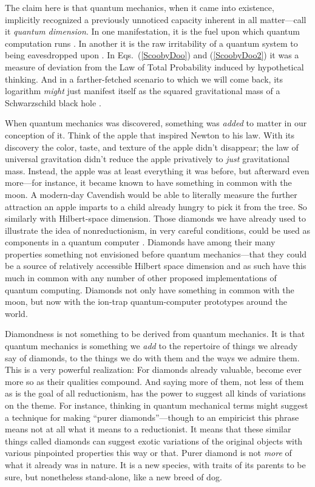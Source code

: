 \documentclass[aps,pra,superscriptaddress,10pt,tightenlines,twocolumn,nofootinbib]{revtex4}
\begin{document}
The claim here is that quantum mechanics, when it came into existence, implicitly recognized a previously unnoticed capacity inherent in all matter---call it {\it quantum dimension}.  In one manifestation, it is the fuel upon which quantum computation runs \cite{Fuchs04b,BlumeKohout02}.  In another it is the raw irritability of a quantum system to being eavesdropped upon \cite{Fuchs03,Cerf02}.  In Eqs.~(\ref{ScoobyDoo}) and (\ref{ScoobyDoo2}) it was a measure of deviation from the Law of Total Probability induced by hypothetical thinking.  And in a farther-fetched scenario to which we will come back, its logarithm {\it might\/} just manifest itself as the squared gravitational mass of a Schwarzschild black hole \cite{Horowitz04,Gottesman04}.

When quantum mechanics was discovered, something was {\it added\/} to matter in our conception of it.  Think of the apple that inspired Newton to his law.  With its discovery the color, taste, and texture of the apple didn't disappear; the law of universal gravitation didn't reduce the apple privatively to {\it just\/} gravitational mass. Instead, the apple was at least everything it was before, but afterward even more---for instance, it became known to have something in common with the moon.  A modern-day Cavendish would be able to literally measure the fur\-ther attraction an apple imparts to a child already hungry to pick it from the tree.  So similarly with Hil\-bert-space dimension.  Those diamonds we have already used to illustrate the idea of nonreductionism, in very careful conditions, could be used as components in a quantum computer \cite{Prawer08}.  Diamonds have among their many properties something not envisioned before quantum mechanics---that they could be a source of relatively accessible Hilbert space dimension and as such have this much in common with any number of other proposed implementations of quantum computing.  Diamonds not only have something in common with the moon, but now with the ion-trap quantum-computer prototypes around the world.

Diamondness is not something to be derived from quantum mechanics.  It is that quantum mechanics is something we {\it add\/} to the repertoire of things we already say of diamonds, to the things we do with them and the ways we admire them.  This is a very powerful realization:  For diamonds already valuable, become ever more so as their qualities compound.  And saying more of them, not less of them as is the goal of all reductionism, has the power to suggest all kinds of variations on the theme.  For instance, thinking in quantum mechanical terms might suggest a technique for making ``purer diamonds''---though to an empiricist this phrase means not at all what it means to a reductionist.  It means that these similar things called diamonds can suggest exotic variations of the original objects with various pinpointed properties this way or that.  Purer diamond is not {\it more\/} of what it already was in nature.  It is a new species, with traits of its parents to be sure, but nonetheless stand-alone, like a new breed of dog.
\end{document}
